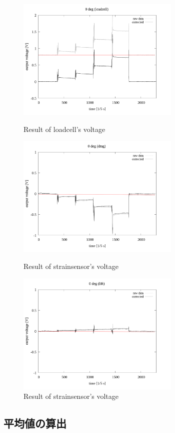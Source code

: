\documentclass[twocolumn,a4j]{jsarticle}
\begin{document}
\begin{figure}[htbp]
    \footnotesize
    \begin{center}
        \includegraphics[width=78mm]{../images/drift/0_loadcell_drift.png}
        \caption{Result of loadcell's voltage}
        \includegraphics[width=78mm]{../images/drift/0_drag_drift.png}
        \caption{Result of strainsensor's voltage}
        \includegraphics[width=78mm]{../images/drift/0_lift_drift.png}
        \caption{Result of strainsensor's voltage}
    \end{center}
\end{figure}

\newpage

\subsection{平均値の算出}
\end{document}

